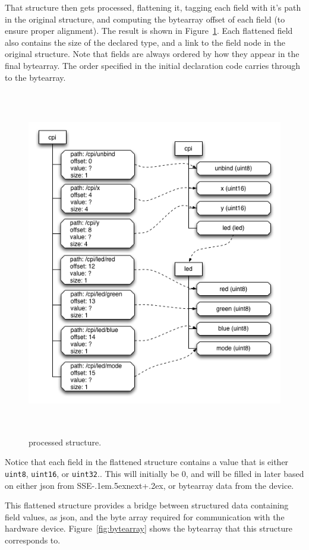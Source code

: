 \documentclass[12pt]{article}
\def\SSEnext{SSE\kern-.1em\lower.5ex\hbox{\footnotesize next}\kern+.2ex}
\def\SSEnext{SSE\kern-.1em\lower.5ex\hbox{\footnotesize next}\kern+.2ex}
\begin{document}
That structure then gets processed, flattening it, tagging each field
with it's path in the original structure, and computing the bytearray
offset of each field (to ensure proper alignment). The result is shown
in Figure~\ref{fig:flattened}. Each flattened field also contains the
size of the declared type, and a link to the field node in the
original structure. Note that fields are always ordered by how they
appear in the final bytearray. The order specified in the initial
declaration code carries through to the bytearray.

\begin{figure}[htbp] %
   \centering
   \includegraphics[height=6in]{flat_structure.png} 
\caption{processed structure.}
\label{fig:flattened}
\end{figure}

Notice that each field in the flattened structure contains a value
that is either \verb|uint8|, \verb|uint16|, or \verb|uint32|..
This will initially be 0, and will be filled in later based on either json
from \SSEnext, or bytearray data from the device.

This flattened structure provides a bridge between structured data
containing field values, as json, and the byte array required for
communication with the hardware device. Figure~\ref{fig:bytearray}
shows the bytearray that this structure corresponds to.
\end{document}
